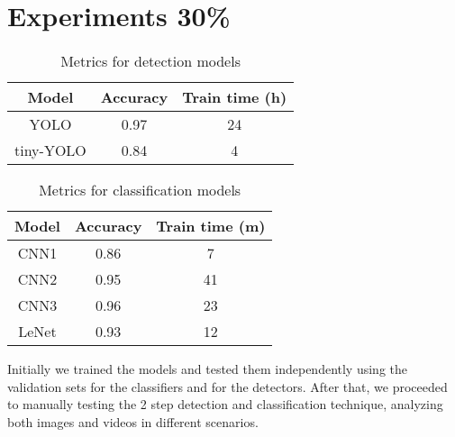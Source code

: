 \section{Experiments 30\%}

\begin{table}[h!]
	\begin{center}
		\begin{tabular}{|c|c|c|}
			\hline
			Model & Accuracy & Train time (h) \\
			\hline\hline
			YOLO & 0.97 & 24 \\
			tiny-YOLO & 0.84 & 4 \\
			\hline
		\end{tabular}
	\end{center}
	\caption{Metrics for detection models}
	\label{yolo-metrics}
\end{table}

\begin{table}[h!]
	\begin{center}
		\begin{tabular}{|c|c|c|}
			\hline
			Model & Accuracy & Train time (m) \\
			\hline\hline
			CNN1 & 0.86 & 7 \\
			CNN2 & 0.95 & 41 \\
			CNN3 & 0.96 & 23 \\
			LeNet & 0.93 & 12 \\
			\hline
		\end{tabular}
	\end{center}
	\caption{Metrics for classification models}
	\label{class-metrics}
\end{table}

Initially we trained the models and tested them independently using the validation sets for the classifiers and for the detectors. After that, we proceeded to manually testing the 2 step detection and classification technique, analyzing both images and videos in different scenarios. 


